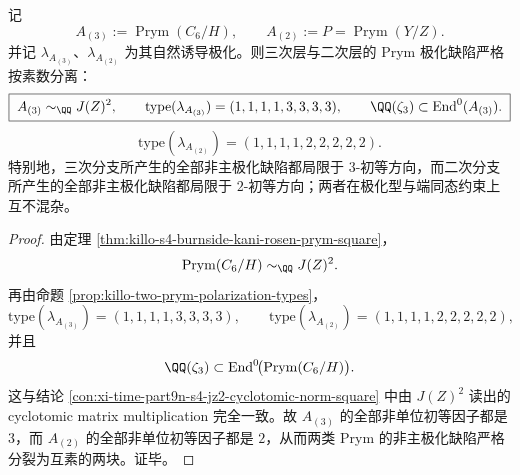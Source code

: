 \begin{conclusion}\label{con:xi-time-part9n-prym-prime-separated-rigidity}
记
\[
A_{(3)}:=\operatorname{Prym}(C_6/H),
\qquad
A_{(2)}:=P=\operatorname{Prym}(Y/Z).
\]
并记 \(\lambda_{A_{(3)}}\)、\(\lambda_{A_{(2)}}\) 为其自然诱导极化。则三次层与二次层的 Prym 极化缺陷严格按素数分离：
\[
\boxed{\;
A_{(3)}\sim_{\QQ}J(Z)^2,\qquad
\mathrm{type}(\lambda_{A_{(3)}})=(1,1,1,1,3,3,3,3),\qquad
\QQ(\zeta_3)\subset \operatorname{End}^0(A_{(3)}).\;}
\]
\[
\boxed{\;
\mathrm{type}(\lambda_{A_{(2)}})=(1,1,1,1,2,2,2,2,2).\;}
\]
特别地，三次分支所产生的全部非主极化缺陷都局限于 \(3\)-初等方向，而二次分支所产生的全部非主极化缺陷都局限于 \(2\)-初等方向；两者在极化型与端同态约束上互不混杂。
\end{conclusion}
\begin{proof}
由定理 \ref{thm:killo-s4-burnside-kani-rosen-prym-square}，
\[
\operatorname{Prym}(C_6/H)\sim_{\QQ}J(Z)^2.
\]
再由命题 \ref{prop:killo-two-prym-polarization-types}，
\[
\mathrm{type}(\lambda_{A_{(3)}})=(1,1,1,1,3,3,3,3),
\qquad
\mathrm{type}(\lambda_{A_{(2)}})=(1,1,1,1,2,2,2,2,2),
\]
并且
\[
\QQ(\zeta_3)\subset \operatorname{End}^0\!\bigl(\operatorname{Prym}(C_6/H)\bigr).
\]
这与结论 \ref{con:xi-time-part9n-s4-jz2-cyclotomic-norm-square} 中由 \(J(Z)^2\) 读出的 cyclotomic matrix multiplication 完全一致。故 \(A_{(3)}\) 的全部非单位初等因子都是 \(3\)，而 \(A_{(2)}\) 的全部非单位初等因子都是 \(2\)，从而两类 Prym 的非主极化缺陷严格分裂为互素的两块。证毕。
\end{proof}

\endinput
